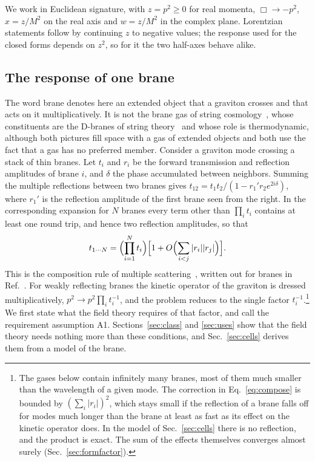 \documentclass[a4paper,11pt]{article}
\begin{document}
We work in Euclidean signature, with $z=p^2\ge0$ for real momenta, $\Box\to-p^2$, $x=z/M^2$ on the real axis and $w=z/M^2$ in the complex plane. Lorentzian statements follow by continuing $z$ to negative values; the response used for the closed forms depends on $z^2$, so for it the two half-axes behave alike.

\subsection{The response of one brane}
\label{sec:onebrane}

The word brane denotes here an extended object that a graviton crosses and that acts on it multiplicatively. It is not the brane gas of string cosmology~\cite{BrandenbergerVafa1989,AlexanderBrandenbergerEasson2000}, whose constituents are the D-branes of string theory~\cite{DaiLeighPolchinski1989,Polchinski1995} and whose role is thermodynamic, although both pictures fill space with a gas of extended objects and both use the fact that a gas has no preferred member. Consider a graviton mode crossing a stack of thin branes. Let $t_i$ and $r_i$ be the forward transmission and reflection amplitudes of brane $i$, and $\delta$ the phase accumulated between neighbors. Summing the multiple reflections between two branes gives $t_{12}=t_1t_2/(1-r_1'r_2e^{2i\delta})$, where $r_1'$ is the reflection amplitude of the first brane seen from the right. In the corresponding expansion for $N$ branes every term other than $\prod_it_i$ contains at least one round trip, and hence two reflection amplitudes, so that
\begin{equation}
\label{eq:compose}
t_{1\cdots N}=\Bigl(\prod_{i=1}^Nt_i\Bigr)\Bigl[1+O\Bigl(\sum_{i<j}|r_i||r_j|\Bigr)\Bigr].
\end{equation}
This is the composition rule of multiple scattering~\cite{Foldy1945,Lax1951}, written out for branes in Ref.~\cite{Bhattacharjee2026}. For weakly reflecting branes the kinetic operator of the graviton is dressed multiplicatively, $p^2\to p^2\prod_it_i^{-1}$, and the problem reduces to the single factor $t_i^{-1}$.\footnote{The gases below contain infinitely many branes, most of them much smaller than the wavelength of a given mode. The correction in Eq.~\eqref{eq:compose} is bounded by $(\sum_i|r_i|)^2$, which stays small if the reflection of a brane falls off for modes much longer than the brane at least as fast as its effect on the kinetic operator does. In the model of Sec.~\ref{sec:cells} there is no reflection, and the product is exact. The sum of the effects themselves converges almost surely (Sec.~\ref{sec:formfactor}).} We first state what the field theory requires of that factor, and call the requirement assumption A1. Sections~\ref{sec:class} and \ref{sec:uses} show that the field theory needs nothing more than these conditions, and Sec.~\ref{sec:cells} derives them from a model of the brane.
\end{document}
